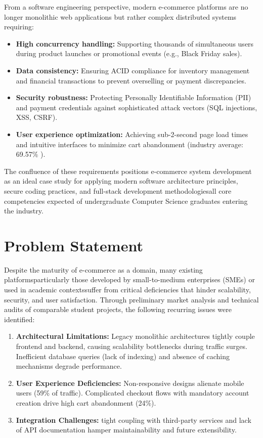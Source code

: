 \documentclass[12pt, a4paper]{report}
\begin{document}
From a software engineering perspective, modern e-commerce platforms are no longer monolithic web applications but rather complex distributed systems requiring:

\begin{itemize}
    \item \textbf{High concurrency handling:} Supporting thousands of simultaneous users during product launches or promotional events (e.g., Black Friday sales).
    \item \textbf{Data consistency:} Ensuring ACID compliance for inventory management and financial transactions to prevent overselling or payment discrepancies.
    \item \textbf{Security robustness:} Protecting Personally Identifiable Information (PII) and payment credentials against sophisticated attack vectors (SQL injections, XSS, CSRF).
   

 \item \textbf{User experience optimization:} Achieving sub-2-second page load times and intuitive interfaces to minimize cart abandonment (industry average: 69.57\% \cite{baymard2023}).
\end{itemize}

The confluence of these requirements positions e-commerce system development as an ideal case study for applying modern software architecture principles, secure coding practices, and full-stack development methodologiesall core competencies expected of undergraduate Computer Science graduates entering the industry.

\section{Problem Statement}

Despite the maturity of e-commerce as a domain, many existing platformsparticularly those developed by small-to-medium enterprises (SMEs) or used in academic contextssuffer from critical deficiencies that hinder scalability, security, and user satisfaction. Through preliminary market analysis and technical audits of comparable student projects, the following recurring issues were identified:

\begin{enumerate}
    \item \textbf{Architectural Limitations:} Legacy monolithic architectures tightly couple frontend and backend, causing scalability bottlenecks during traffic surges. Inefficient database queries (lack of indexing) and absence of caching mechanisms degrade performance.
    
    \item \textbf{User Experience Deficiencies:} Non-responsive designs alienate mobile users (59\% of traffic). Complicated checkout flows with mandatory account creation drive high cart abandonment (24\%).
    
    \item \textbf{Integration Challenges:} tight coupling with third-party services and lack of API documentation hamper maintainability and future extensibility.
\end{enumerate}
\end{document}
